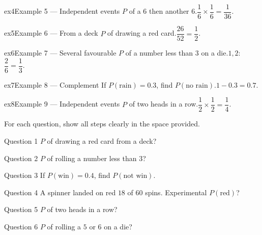 \documentclass[11pt]{article}
\begin{document}
\begin{example}{ex4}{Example 5 --- Independent events}
$P$ of a $6$ then another $6$.\soln $\dfrac16\times\dfrac16=\dfrac1{36}$.
\end{example}

\begin{example}{ex5}{Example 6 --- From a deck}
$P$ of drawing a red card.\soln $\dfrac{26}{52}=\dfrac12$.
\end{example}

\begin{example}{ex6}{Example 7 --- Several favourable}
$P$ of a number less than $3$ on a die.\soln $1,2$: $\dfrac26=\dfrac13$.
\end{example}

\begin{example}{ex7}{Example 8 --- Complement}
If $P(\text{rain})=0.3$, find $P(\text{no rain})$.\soln $1-0.3=0.7$.
\end{example}

\begin{example}{ex8}{Example 9 --- Independent events}
$P$ of two heads in a row.\soln $\dfrac12\times\dfrac12=\dfrac14$.
\end{example}

\clearpage
{}
For each question, show all steps clearly in the space provided.

\begin{qbox}{Question 1}
$P$ of drawing a red card from a deck?\workspace{2.4cm}
\end{qbox}

\begin{qbox}{Question 2}
$P$ of rolling a number less than $3$?\workspace{2.4cm}
\end{qbox}

\begin{qbox}{Question 3}
If $P(\text{win})=0.4$, find $P(\text{not win})$.\workspace{2.4cm}
\end{qbox}

\begin{qbox}{Question 4}
A spinner landed on red $18$ of $60$ spins. Experimental $P(\text{red})$?\workspace{2.4cm}
\end{qbox}

\begin{qbox}{Question 5}
$P$ of two heads in a row?\workspace{2.4cm}
\end{qbox}

\begin{qbox}{Question 6}
$P$ of rolling a $5$ or $6$ on a die?\workspace{2.4cm}
\end{qbox}
\end{document}
